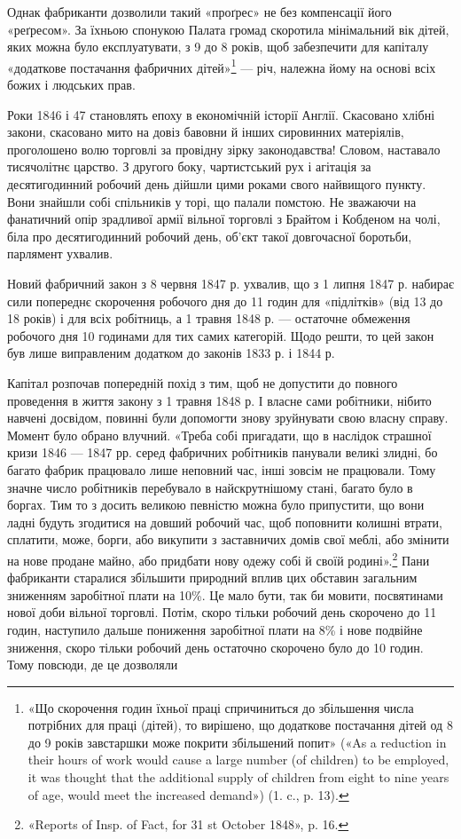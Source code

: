 Однак фабриканти дозволили такий «проґрес» не без компенсації
його «реґресом». За їхньою спонукою Палата громад скоротила
мінімальний вік дітей, яких можна було експлуатувати,
з 9 до 8 років, щоб забезпечити для капіталу «додаткове постачання
фабричних дітей»\footnote{
«Що скорочення годин їхньої праці спричиниться до збільшення
числа потрібних для праці (дітей), то вирішено, що додаткове постачання
дітей од 8 до 9 років завстаршки може покрити збільшений
попит» («As a reduction in their hours of work would cause a large number
(of children) to be employed, it was thought that the additional supply of
children from eight to nine years of age, would meet the increased demand»)
(1. c., p. 13).
} — річ, належна йому на основі всіх
божих і людських прав.

Роки 1846 і 47 становлять епоху в економічній історії Англії.
Скасовано хлібні закони, скасовано мито на довіз бавовни й
інших сировинних матеріялів, проголошено волю торговлі за
провідну зірку законодавства! Словом, наставало тисячолітнє
царство. З другого боку, чартистський рух і агітація за десятигодинний
робочий день дійшли цими роками свого найвищого
пункту. Вони знайшли собі спільників у торі, що палали помстою.
Не зважаючи на фанатичний опір зрадливої армії вільної торговлі
з Брайтом і Кобденом на чолі, біла про десятигодинний робочий
день, об’єкт такої довгочасної боротьби, парлямент ухвалив.

Новий фабричний закон з 8 червня 1847 р. ухвалив, що з
1 липня 1847 р. набирає сили попереднє скорочення робочого дня
до 11 годин для «підлітків» (від 13 до 18 років) і для всіх робітниць,
а 1 травня 1848 р. — остаточне обмеження робочого
дня 10 годинами для тих самих категорій. Щодо решти, то цей
закон був лише виправленим додатком до законів 1833 р. і 1844 р.

Капітал розпочав попередній похід з тим, щоб не допустити
до повного проведення в життя закону з 1 травня 1848 р. І власне
сами робітники, нібито навчені досвідом, повинні були допомогти
знову зруйнувати свою власну справу. Момент було обрано влучний.
«Треба собі пригадати, що в наслідок страшної кризи 1846 —
1847 рр. серед фабричних робітників панували великі злидні,
бо багато фабрик працювало лише неповний час, інші зовсім не
працювали. Тому значне число робітників перебувало в найскрутнішому
стані, багато було в боргах. Тим то з досить великою
певністю можна було припустити, що вони ладні будуть згодитися
на довший робочий час, щоб поповнити колишні втрати, сплатити,
може, борги, або викупити з заставничих домів свої меблі, або
змінити на нове продане майно, або придбати нову одежу собі й
своїй родині».\footnote{
«Reports of Insp. of Fact, for 31 st October 1848», p. 16.
} Пани фабриканти старалися збільшити природний
вплив цих обставин загальним зниженням заробітної плати
на 10\%. Це мало бути, так би мовити, посвятинами нової доби
вільної торговлі. Потім, скоро тільки робочий день скорочено
до 11 годин, наступило дальше пониження заробітної плати на
8\% і нове подвійне зниження, скоро тільки робочий день остаточно
скорочено було до 10 годин. Тому повсюди, де це дозволяли
\parbreak{}  %
